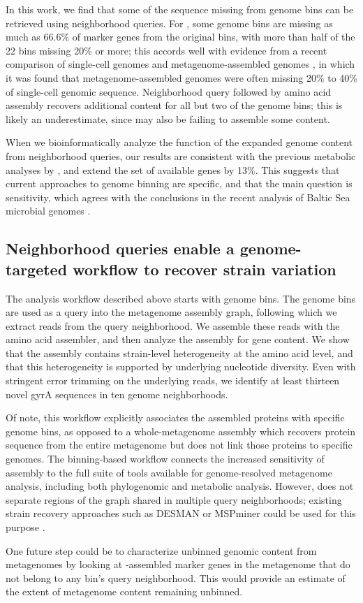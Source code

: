 In this work, we find that some of the sequence missing from genome
bins can be retrieved using neighborhood queries.  For \hu, some
genome bins are missing as much as 66.6\% of marker genes from the
original bins, with more than half of the 22 bins missing 20\% or
more; this accords well with evidence from a recent comparison of
single-cell genomes and metagenome-assembled genomes \cite{baltic}, in
which it was found that metagenome-assembled genomes were often
missing 20\% to 40\% of single-cell genomic sequence.  Neighborhood
query followed by amino acid assembly recovers additional content for
all but two of the genome bins; this is likely an underestimate, since
\plass may also be failing to assemble some content.

When we bioinformatically analyze the
function of the expanded genome content from neighborhood queries, our
results are consistent with the previous metabolic analyses by \cite{Hu2016}, and extend the
set of available genes by 13\%.
This suggests that current approaches to genome binning are specific,
and that the main question is sensitivity, which agrees with the conclusions
in the recent analysis of Baltic Sea microbial genomes \cite{baltic}.

\subsection*{Neighborhood queries enable a genome-targeted workflow to recover strain variation}

The analysis workflow described above starts with genome bins. The
genome bins are used as a query into the metagenome assembly graph,
following which we extract reads from the query neighborhood.  We
assemble these reads with the \plass amino acid assembler, and then
analyze the assembly for gene content. We show that the \plass
assembly contains strain-level heterogeneity at the amino acid level,
and that this heterogeneity is supported by underlying nucleotide
diversity.  Even with stringent error trimming on the underlying
reads, we identify at least thirteen novel gyrA sequences in ten
genome neighborhoods.

Of note, this workflow explicitly associates the \plass assembled
proteins with specific genome bins, as opposed to a whole-metagenome
\plass assembly which recovers protein sequence from the entire
metagenome but does not link those proteins to specific genomes. The
binning-based workflow connects the increased sensitivity of \plass
assembly to the full suite of tools available for genome-resolved
metagenome analysis, including both phylogenomic and metabolic
analysis. However, \sgc does not separate regions of the graph shared
in multiple query neighborhoods; existing
strain recovery approaches such as DESMAN or MSPminer could be used for this purpose
\cite{desman,mspminer}.

One future step could be to characterize unbinned genomic
content from metagenomes by looking at \plass-assembled marker genes
in the metagenome that do not belong to any bin's query neighborhood.
This would provide an estimate of the extent of
metagenome content remaining unbinned.

